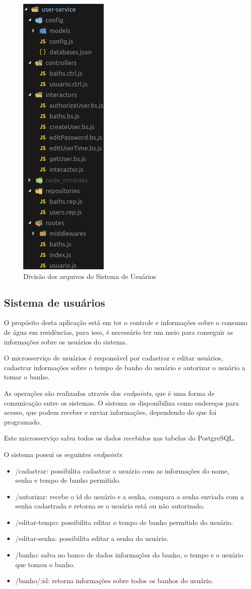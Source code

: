 \begin{figure}[htbp]
	\centering
	\includegraphics[width=0.22\linewidth]{figuras/cleanarch.png}
	\caption{Divisão dos arquivos do Sistema de Usuários}
	\label{fig:clean}
\end{figure}

\subsection{Sistema de usuários} \label{sec:usuarios}

O propósito desta aplicação está em ter o controle e informações sobre o consumo de água em residências, para isso, é necessário ter um meio para conseguir as informações sobre os usuários do sistema. 

O microsserviço de usuários é responsável por cadastrar e editar usuários, cadastrar informações sobre o tempo de banho do usuário e autorizar o usuário a tomar o banho.

As operações são realizadas através dos \textit{endpoints}, que é uma forma de comunicação entre os sistemas. O sistema os disponibiliza como endereços para acesso, que podem receber e enviar informações, dependendo do que foi programado.

Este microsserviço salva todos os dados recebidos nas tabelas do PostgreSQL.

O sistema possui os seguintes \textit{endpoints}:


\begin{itemize} \label{item:endpoints}
	\item /cadastrar: possibilita cadastrar o usuário com as informações do nome, senha e tempo de banho permitido.
	\item /autorizar: recebe o id do usuário e a senha, compara a senha enviada com a senha cadastrada e retorna se o usuário está ou não autorizado.
	\item /editar-tempo: possibilita editar o tempo de banho permitido do usuário.
	\item /editar-senha: possibilita editar a senha do usuário.
	\item /banho: salva no banco de dados informações do banho, o tempo e o usuário que tomou o banho.
	\item /banho/:id: retorna informações sobre todos os banhos do usuário.
\end{itemize}

